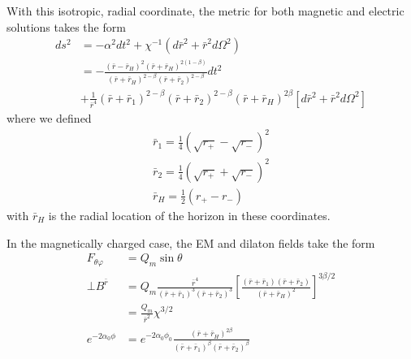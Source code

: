 \documentclass[%
 reprint,
 amsmath,amssymb,
 aps,
]{revtex4-1}
\begin{document}
With this isotropic, radial coordinate, the metric for both magnetic and electric solutions takes the form
\begin{align}
ds^2 &= - \alpha^2 dt^2 + \chi^{-1} (d\bar{r}^2 + \bar{r}^2 d\Omega^2) \nonumber \\
        &= -\frac{(\bar{r} - \bar{r}_H)^2 (\bar{r}+\bar{r}_H)^{2(1-\beta)}}{(\bar{r}+\bar{r}_H)^{2-\beta} (\bar{r}+\bar{r}_2)^{2-\beta}} dt^2 \nonumber \\
        &+ \frac{1}{\bar{r}^4}(\bar{r}+\bar{r}_1)^{2-\beta} (\bar{r}+\bar{r}_2)^{2-\beta} (\bar{r} + \bar{r}_H)^{2\beta} [ d\bar{r}^2 + \bar{r}^2 d\Omega^2]
\end{align}
where we defined
\begin{align}
\bar{r}_1 = \frac{1}{4} (\sqrt{r_+} - \sqrt{r_-})^2 \\
\bar{r}_2 = \frac{1}{4} (\sqrt{r_+} + \sqrt{r_-})^2 \\
\bar{r}_H = \frac{1}{2} (r_+ - r_-)
\end{align}
with $\bar{r}_H$ is the radial location of the horizon in these coordinates.

In the magnetically charged case, the EM and dilaton fields take the form
\begin{align}
F_{\theta \varphi} &= Q_m \sin \theta \\
\bot B^{\bar{r}} &= Q_m \frac{\bar{r}^4}{(\bar{r} + \bar{r}_1)^3 (\bar{r}+\bar{r}_2)^3} \left[\frac{(\bar{r}+\bar{r}_1)(\bar{r}+\bar{r}_2)}{(\bar{r}+\bar{r}_H)^2} \right]^{3\beta/2} \nonumber \\
&= \frac{Q_m}{\bar{r}^2} \chi^{3/2} \\
e^{-2 \alpha_0 \phi} &= e^{-2 \alpha_0 \phi_0} \frac{(\bar{r}+\bar{r}_H)^{2 \beta}}{(\bar{r}+\bar{r}_1)^\beta (\bar{r} + \bar{r}_2)^\beta}
\end{align}
\end{document}
